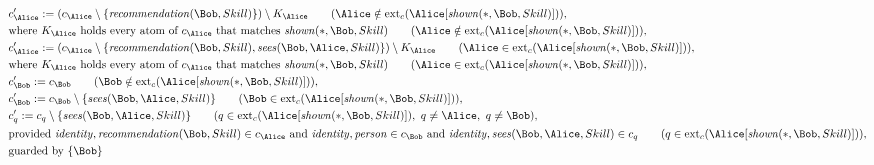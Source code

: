 \begin{align*}
&
c'_
{
\Alice
}
 := 
(c_
{
\Alice
}
 \setminus 
\{
\mathit{\detokenize{
recommendation
}}
(
\Bob
,
Skill
)
\}
) \setminus K_
{
\Alice
}
 \qquad (
\Alice
 \notin 
\mathrm{ext}_c(
\Alice
[
\mathit{\detokenize{
shown
}}
(
\ast
,
\Bob
,
Skill
)
]
)
)
,\\
&
\text{where } K_
{
\Alice
}
 \text{ holds every atom of } c_
{
\Alice
}
 \text{ that matches } 
\mathit{\detokenize{
shown
}}
(
\ast
,
\Bob
,
Skill
)
 \qquad (
\Alice
 \notin 
\mathrm{ext}_c(
\Alice
[
\mathit{\detokenize{
shown
}}
(
\ast
,
\Bob
,
Skill
)
]
)
)
,\\
&
c'_
{
\Alice
}
 := 
(c_
{
\Alice
}
 \setminus 
\{
\mathit{\detokenize{
recommendation
}}
(
\Bob
,
Skill
)
,
\mathit{\detokenize{
sees
}}
(
\Bob
,
\Alice
,
Skill
)
\}
) \setminus K_
{
\Alice
}
 \qquad (
\Alice
 \in 
\mathrm{ext}_c(
\Alice
[
\mathit{\detokenize{
shown
}}
(
\ast
,
\Bob
,
Skill
)
]
)
)
,\\
&
\text{where } K_
{
\Alice
}
 \text{ holds every atom of } c_
{
\Alice
}
 \text{ that matches } 
\mathit{\detokenize{
shown
}}
(
\ast
,
\Bob
,
Skill
)
 \qquad (
\Alice
 \in 
\mathrm{ext}_c(
\Alice
[
\mathit{\detokenize{
shown
}}
(
\ast
,
\Bob
,
Skill
)
]
)
)
,\\
&
c'_
{
\Bob
}
 := 
c_
{
\Bob
}
 \qquad (
\Bob
 \notin 
\mathrm{ext}_c(
\Alice
[
\mathit{\detokenize{
shown
}}
(
\ast
,
\Bob
,
Skill
)
]
)
)
,\\
&
c'_
{
\Bob
}
 := 
c_
{
\Bob
}
 \setminus 
\{
\mathit{\detokenize{
sees
}}
(
\Bob
,
\Alice
,
Skill
)
\}
 \qquad (
\Bob
 \in 
\mathrm{ext}_c(
\Alice
[
\mathit{\detokenize{
shown
}}
(
\ast
,
\Bob
,
Skill
)
]
)
)
,\\
&
c'_
q
 := 
c_
q
 \setminus 
\{
\mathit{\detokenize{
sees
}}
(
\Bob
,
\Alice
,
Skill
)
\}
 \qquad (
q
 \in 
\mathrm{ext}_c(
\Alice
[
\mathit{\detokenize{
shown
}}
(
\ast
,
\Bob
,
Skill
)
]
)
,\ 
q \neq 
\Alice
,\ 
q \neq 
\Bob
)
,\\
&
\text{provided } 
\mathit{\detokenize{
identity
}}
,
\mathit{\detokenize{
recommendation
}}
(
\Bob
,
Skill
)
 \in c_
{
\Alice
}
 \text{ and } 
\mathit{\detokenize{
identity
}}
,
\mathit{\detokenize{
person
}}
 \in c_
{
\Bob
}
 \text{ and } 
\mathit{\detokenize{
identity
}}
,
\mathit{\detokenize{
sees
}}
(
\Bob
,
\Alice
,
Skill
)
 \in c_
q
 \qquad (
q \in 
\mathrm{ext}_c(
\Alice
[
\mathit{\detokenize{
shown
}}
(
\ast
,
\Bob
,
Skill
)
]
)
)
,\\
&
\text{guarded by } \{
\Bob
\}
\end{align*}
\iffalse
